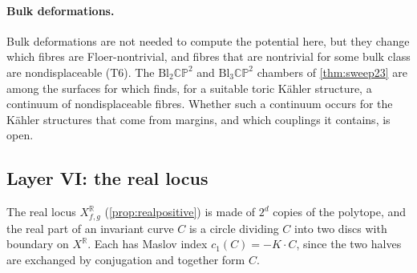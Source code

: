\documentclass[11pt]{article}
\theoremstyle{definition}
\theoremstyle{remark}
\newcommand{\R}{\mathbb{R}}
\begin{document}
\paragraph{Bulk deformations.} Bulk deformations are not needed to compute the potential here, but they change which fibres are
Floer-nontrivial, and fibres that are nontrivial for some bulk class are nondisplaceable (T6). The $\mathrm{Bl}_2\mathbb{CP}^2$ and
$\mathrm{Bl}_3\mathbb{CP}^2$ chambers of \cref{thm:sweep23} are among the surfaces for which \cite[Thm.~1.1]{FOOO2011} finds, for a suitable toric Kähler
structure, a continuum of nondisplaceable fibres. Whether such a continuum occurs for the Kähler structures that come from margins, and
which couplings it contains, is open.

\subsection{Layer VI: the real locus}\label{sec:layerVI}

The real locus $X^{\R}_{f,g}$ (\cref{prop:realpositive}) is made of $2^d$ copies of the polytope, and the real part of an invariant curve $C$ is a
circle dividing $C$ into two discs with boundary on $X^{\R}$. Each has Maslov index $c_1(C)=-K\cdot C$, since the two halves are exchanged
by conjugation and together form $C$.
\end{document}
